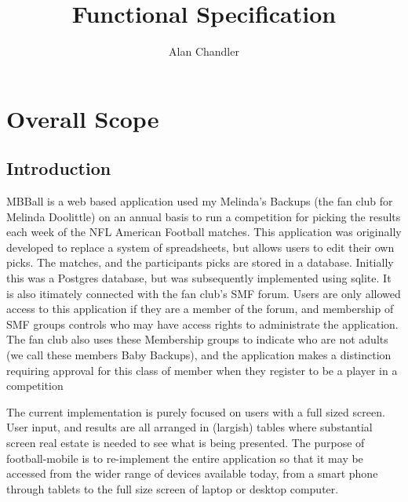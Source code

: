 \documentclass{czen}
\author{Alan Chandler}
\title{Functional Specification}
\begin{document}
\maketitle
{}
\tableofcontents
\section{Overall Scope}
\subsection{Introduction}
MBBall is a web based application used my Melinda's Backups (the fan club for Melinda Doolittle) on an annual basis to run a competition for picking the results each week of the NFL American Football matches.  This application was originally developed to replace a system of spreadsheets, but allows users to edit their own picks.  The matches, and the participants picks are stored in a database.  Initially this was a Postgres database, but was subsequently implemented using sqlite.  It is also itimately connected with the fan club's SMF forum.  Users are only allowed access to this application if they are a member of the forum, and membership of SMF groups controls who may have access rights to administrate the application.  The fan club also uses these Membership groups to indicate who are not adults (we call these members Baby Backups), and the application makes a distinction requiring approval for this class of member when they register to be a player in a competition

The current implementation is purely focused on users with a full sized screen.  User input, and results are all arranged in (largish) tables where substantial screen real estate is needed to see what is being presented.  The purpose of football-mobile is to re-implement the entire application so that it may be accessed from the wider range of devices available today, from a smart phone through tablets to the full size screen of laptop or desktop computer.
\end{document}
